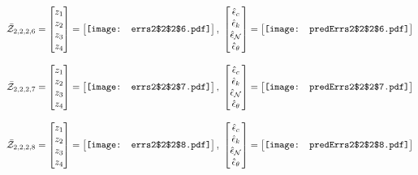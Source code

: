 \documentclass[12pt]{article}
\begin{document}
\begin{gather*}
\bar{\mathcal{Z}}_{2,2,2,6}=\begin{bmatrix}
z_1\\
z_2\\
z_3\\
z_4
 \end{bmatrix}= \begin{bmatrix}
\vcenter{\hbox{\texttt{[image: errs2\$2\$2\$6.pdf]}}}
 \end{bmatrix},\,\, \begin{bmatrix}
\hat{\epsilon}_c\\\hat{\epsilon}_k\\\hat{\epsilon}_\mathcal{N}\\\hat{\epsilon}_\theta
 \end{bmatrix}=\begin{bmatrix}
\vcenter{\hbox{\texttt{[image: predErrs2\$2\$2\$6.pdf]}}}
 \end{bmatrix}
\end{gather*}


\begin{gather*}
\bar{\mathcal{Z}}_{2,2,2,7}=\begin{bmatrix}
z_1\\
z_2\\
z_3\\
z_4
 \end{bmatrix}= \begin{bmatrix}
\vcenter{\hbox{\texttt{[image: errs2\$2\$2\$7.pdf]}}}
 \end{bmatrix},\,\, \begin{bmatrix}
\hat{\epsilon}_c\\\hat{\epsilon}_k\\\hat{\epsilon}_\mathcal{N}\\\hat{\epsilon}_\theta
 \end{bmatrix}=\begin{bmatrix}
\vcenter{\hbox{\texttt{[image: predErrs2\$2\$2\$7.pdf]}}}
 \end{bmatrix}
\end{gather*}


\begin{gather*}
\bar{\mathcal{Z}}_{2,2,2,8}=\begin{bmatrix}
z_1\\
z_2\\
z_3\\
z_4
 \end{bmatrix}= \begin{bmatrix}
\vcenter{\hbox{\texttt{[image: errs2\$2\$2\$8.pdf]}}}
 \end{bmatrix},\,\, \begin{bmatrix}
\hat{\epsilon}_c\\\hat{\epsilon}_k\\\hat{\epsilon}_\mathcal{N}\\\hat{\epsilon}_\theta
 \end{bmatrix}=\begin{bmatrix}
\vcenter{\hbox{\texttt{[image: predErrs2\$2\$2\$8.pdf]}}}
 \end{bmatrix}
\end{gather*}
\end{document}
